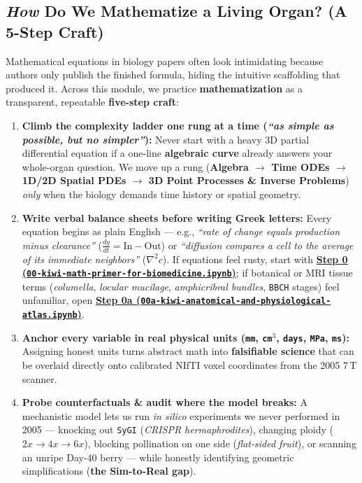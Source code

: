 \documentclass[10pt,a4paper]{article}
\newcommand{\ghblob}{https://github.com/arvidl/BMED365-2027/blob/main}
\begin{document}
\begin{enumerate}
\end{enumerate}

\subsection{\texorpdfstring{\textit{How}}{How} Do We Mathematize a Living Organ? (A 5-Step Craft)}

Mathematical equations in biology papers often look intimidating because authors only publish the finished formula, hiding the intuitive scaffolding that produced it. Across this module, we practice \textbf{mathematization} as a transparent, repeatable \textbf{five-step craft}:

\begin{enumerate}
    \item \textbf{Climb the complexity ladder one rung at a time (\textit{``as simple as possible, but no simpler''}):} Never start with a heavy 3D partial differential equation if a one-line \textbf{algebraic curve} already answers your whole-organ question. We move up a rung (\textbf{Algebra $\to$ Time ODEs $\to$ 1D/2D Spatial PDEs $\to$ 3D Point Processes \& Inverse Problems}) \textit{only} when the biology demands time history or spatial geometry.
    \item \textbf{Write verbal balance sheets before writing Greek letters:} Every equation begins as plain English --- e.g., \textit{``rate of change equals production minus clearance''} ($\frac{dy}{dt} = \text{In} - \text{Out}$) or \textit{``diffusion compares a cell to the average of its immediate neighbors''} ($\nabla^2 c$). If equations feel rusty, start with \href{\ghblob/Lab5-Comp-Mod/Kiwi-challenge/notebooks/00-kiwi-math-primer-for-biomedicine.ipynb}{\textbf{Step 0 (\nolinkurl{00-kiwi-math-primer-for-biomedicine.ipynb})}}; if botanical or MRI tissue terms (\textit{columella}, \textit{locular mucilage}, \textit{amphicribral bundles}, \texttt{BBCH} stages) feel unfamiliar, open \href{\ghblob/Lab5-Comp-Mod/Kiwi-challenge/notebooks/00a-kiwi-anatomical-and-physiological-atlas.ipynb}{\textbf{Step 0a (\nolinkurl{00a-kiwi-anatomical-and-physiological-atlas.ipynb})}}.
    \item \textbf{Anchor every variable in real physical units (\texttt{mm}, \texttt{cm$^3$}, \texttt{days}, \texttt{MPa}, \texttt{ms}):} Assigning honest units turns abstract math into \textbf{falsifiable science} that can be overlaid directly onto calibrated NIfTI voxel coordinates from the 2005 7\,T scanner.
    \item \textbf{Probe counterfactuals \& audit where the model breaks:} A mechanistic model lets us run \textit{in silico} experiments we never performed in 2005 --- knocking out \texttt{SyGI} (\textit{CRISPR hermaphrodites}), changing ploidy ($2x \to 4x \to 6x$), blocking pollination on one side (\textit{flat-sided fruit}), or scanning an unripe Day-40 berry --- while honestly identifying geometric simplifications (\textbf{the Sim-to-Real gap}).

\end{enumerate}
\end{document}
